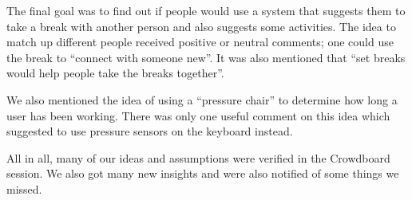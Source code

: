 The final goal was to find out if people would use a system that suggests them to take a break with another person and also suggests some activities. The idea to match up different people received positive or neutral comments; one could use the break to ``connect with someone new''. It was also mentioned that ``set breaks would help people take the breaks together''.

We also mentioned the idea of using a ``pressure chair'' to determine how long a user has been working. There was only one useful comment on this idea which suggested to use pressure sensors on the keyboard instead.

All in all, many of our ideas and assumptions were verified in the Crowdboard session. We also got many new insights and were also notified of some things we missed.

